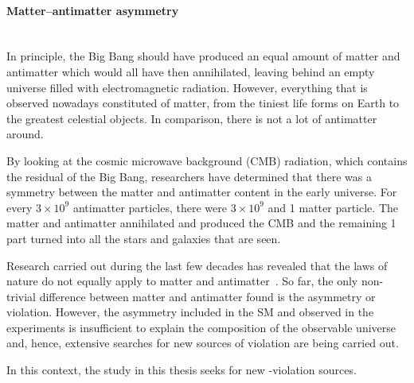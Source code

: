 \paragraph{Matter--antimatter asymmetry}\mbox{}\\
In principle, the Big Bang should have produced an equal amount of matter and antimatter 
which would all have then annihilated, leaving behind an empty universe filled with electromagnetic radiation.
 However, everything that is observed nowadays constituted of matter, from the tiniest life forms 
 on Earth to the greatest celestial objects. In comparison, there is not a lot of antimatter around. 

By looking at the cosmic microwave background (CMB) radiation, which contains the residual \Pgamma of the Big Bang, researchers 
have determined that there was a symmetry between the matter and antimatter content in the early universe. 
For every $3 \times 10^{9}$ antimatter particles, there were $3 \times 10^{9}$ and 1 matter particle.
The matter and antimatter annihilated and produced the CMB and the remaining 1 part turned into all the 
stars and galaxies that are seen.  %

Research carried out during the last few decades has revealed that the laws of nature do not equally apply to
matter and antimatter~\cite{Sakharov:1967dj}. So far, the only non-trivial difference between matter and 
antimatter found is the \CP asymmetry or \CP violation. 
However, the \CP asymmetry included in the SM and observed in the experiments is insufficient 
to explain the composition of the observable universe and, hence, extensive searches for new sources of \CP 
violation are being carried out.

In this context, the study in this thesis seeks for new \CP-violation sources. %






